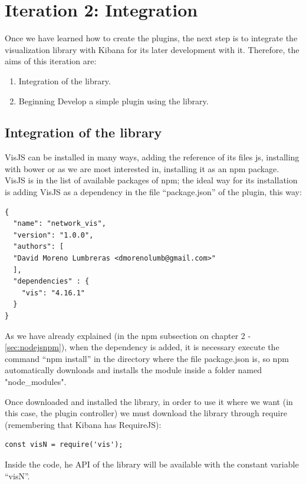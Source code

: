 \documentclass[a4paper, 12pt]{book}
\begin{document}
\section{Iteration 2: Integration}

Once we have learned how to create the plugins, the next step is to integrate the visualization library with Kibana for its later development with it. Therefore, the aims of this iteration are:

\begin{enumerate}
\item Integration of the library.
\item Beginning Develop a simple plugin using the library.
\end{enumerate}

\subsection{Integration of the library}

VisJS can be installed in many ways, adding the reference of its files js, installing with bower or as we are most interested in, installing it as an npm package. VisJS is in the list of available packages of npm; the ideal way for its installation is adding VisJS as a dependency in the file “package.json” of the plugin, this way:

\begin{lstlisting}[frame=single]
{
  "name": "network_vis",
  "version": "1.0.0",
  "authors": [
  "David Moreno Lumbreras <dmorenolumb@gmail.com>"
  ],
  "dependencies" : {
    "vis": "4.16.1"
  }
}
\end{lstlisting}

As we have already explained (in the npm subsection on chapter 2 - \ref{sec:nodejsnpm}), when the dependency is added, it is necessary execute the command “npm install” in the directory where the file package.json is, so npm automatically downloads and installs the module inside a folder named "node\_modules".

Once downloaded and installed the library, in order to use it where we want (in this case, the plugin controller) we must download the library through require (remembering that Kibana has RequireJS):

\begin{lstlisting}[frame=single]
	const visN = require('vis');
\end{lstlisting}

Inside the code, he API of the library will be available with the constant variable “visN”.
\end{document}
